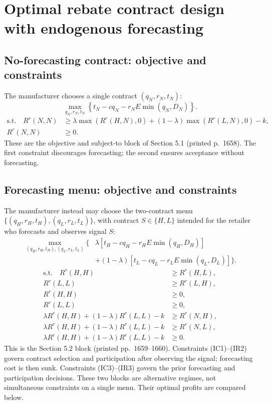 \documentclass{article}
\begin{document}
\section*{Optimal rebate contract design with endogenous forecasting}

\subsection*{No-forecasting contract: objective and constraints}
The manufacturer chooses a single contract $(q_N,r_N,t_N)$:
\begin{equation}
\max_{q_N,r_N,t_N}\left\{t_N-cq_N-r_NE\min(q_N,D_N)\right\}.
\tag{OBJ--N}
\end{equation}
\begin{align}
\text{s.t.}\quad R^r(N,N)&\geq \lambda\max(R^r(H,N),0)
 +(1-\lambda)\max(R^r(L,N),0)-k,\tag{IC}\\
R^r(N,N)&\geq 0.\tag{IR}
\end{align}
These are the objective and subject-to block of Section 5.1 (printed p.~1658). The first constraint discourages forecasting; the second ensures acceptance without forecasting.

\subsection*{Forecasting menu: objective and constraints}
The manufacturer instead may choose the two-contract menu
$\{(q_H,r_H,t_H),(q_L,r_L,t_L)\}$, with contract $S\in\{H,L\}$ intended for the retailer who forecasts and observes signal $S$:
\begin{equation}
\begin{split}
\max_{(q_H,r_H,t_H),(q_L,r_L,t_L)}\bigl\{
&\lambda[t_H-cq_H-r_HE\min(q_H,D_H)]\\
&+(1-\lambda)[t_L-cq_L-r_LE\min(q_L,D_L)]\bigr\}.
\end{split}
\tag{OBJ--F}
\end{equation}
\begin{align}
\text{s.t.}\quad R^r(H,H)&\geq R^r(H,L),\tag{IC1}\\
R^r(L,L)&\geq R^r(L,H),\tag{IC2}\\
R^r(H,H)&\geq 0,\tag{IR1}\\
R^r(L,L)&\geq 0,\tag{IR2}\\
\lambda R^r(H,H)+(1-\lambda)R^r(L,L)-k
&\geq R^r(N,H),\tag{IC3}\\
\lambda R^r(H,H)+(1-\lambda)R^r(L,L)-k
&\geq R^r(N,L),\tag{IC4}\\
\lambda R^r(H,H)+(1-\lambda)R^r(L,L)-k
&\geq 0.\tag{IR3}
\end{align}
This is the Section 5.2 block (printed pp.~1659--1660). Constraints (IC1)--(IR2) govern contract selection and participation after observing the signal; forecasting cost is then sunk. Constraints (IC3)--(IR3) govern the prior forecasting and participation decisions. These two blocks are alternative regimes, not simultaneous constraints on a single menu. Their optimal profits are compared below.
\end{document}
